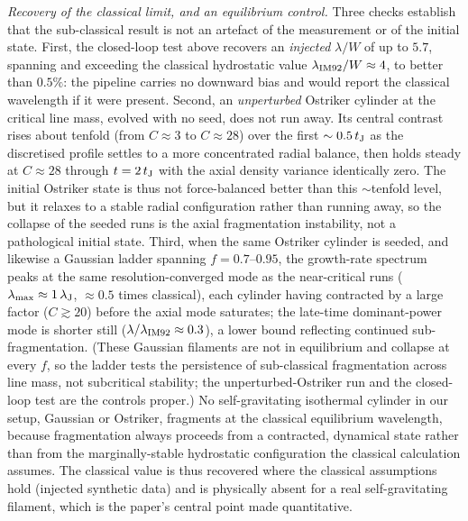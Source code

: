 \documentclass[usenatbib,twoside,twocolumn]{mnras}
\begin{document}
\emph{Recovery of the classical limit, and an equilibrium control.} Three checks establish that the sub-classical result is not an artefact of the measurement or of the initial state. First, the closed-loop test above recovers an \emph{injected} $\lambda/W$ of up to $5.7$, spanning and exceeding the classical hydrostatic value $\lambda_{\rm IM92}/W\approx4$, to better than $0.5\%$: the pipeline carries no downward bias and would report the classical wavelength if it were present. Second, an \emph{unperturbed} Ostriker cylinder at the critical line mass, evolved with no seed, does not run away. Its central contrast rises about tenfold (from $C\approx3$ to $C\approx28$) over the first $\sim0.5\,t_{\rm J}$ as the discretised profile settles to a more concentrated radial balance, then holds steady at $C\approx28$ through $t=2\,t_{\rm J}$ with the axial density variance identically zero. The initial Ostriker state is thus not force-balanced better than this $\sim$tenfold level, but it relaxes to a stable radial configuration rather than running away, so the collapse of the seeded runs is the axial fragmentation instability, not a pathological initial state. Third, when the same Ostriker cylinder is seeded, and likewise a Gaussian ladder spanning $f=0.7$--$0.95$, the growth-rate spectrum peaks at the same resolution-converged mode as the near-critical runs ($\lambda_{\rm max}\approx1\,\lambda_{\rm J}$, $\approx0.5$ times classical), each cylinder having contracted by a large factor ($C\gtrsim20$) before the axial mode saturates; the late-time dominant-power mode is shorter still ($\lambda/\lambda_{\rm IM92}\approx0.3$), a lower bound reflecting continued sub-fragmentation. (These Gaussian filaments are not in equilibrium and collapse at every $f$, so the ladder tests the persistence of sub-classical fragmentation across line mass, not subcritical stability; the unperturbed-Ostriker run and the closed-loop test are the controls proper.) No self-gravitating isothermal cylinder in our setup, Gaussian or Ostriker, fragments at the classical equilibrium wavelength, because fragmentation always proceeds from a contracted, dynamical state rather than from the marginally-stable hydrostatic configuration the classical calculation assumes. The classical value is thus recovered where the classical assumptions hold (injected synthetic data) and is physically absent for a real self-gravitating filament, which is the paper's central point made quantitative.
\end{document}
